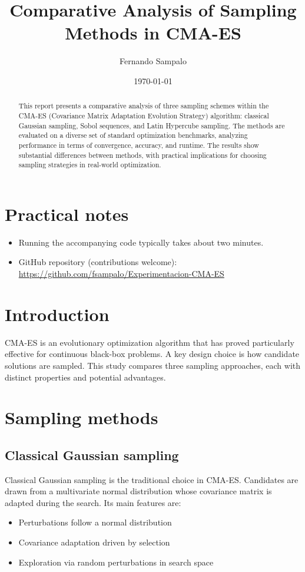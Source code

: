\documentclass[12pt,a4paper]{article}
\title{Comparative Analysis of Sampling Methods in CMA-ES}
\author{Fernando Sampalo}
\date{\today}
\begin{document}
\maketitle

\begin{abstract}
This report presents a comparative analysis of three sampling schemes within the CMA-ES (Covariance Matrix Adaptation Evolution Strategy) algorithm: classical Gaussian sampling, Sobol sequences, and Latin Hypercube sampling. The methods are evaluated on a diverse set of standard optimization benchmarks, analyzing performance in terms of convergence, accuracy, and runtime. The results show substantial differences between methods, with practical implications for choosing sampling strategies in real-world optimization.
\end{abstract}

\section{Practical notes}
\begin{itemize}
    \item Running the accompanying code typically takes about two minutes.
    \item GitHub repository (contributions welcome): \url{https://github.com/fsampalo/Experimentacion-CMA-ES}
\end{itemize}


\section{Introduction}
CMA-ES is an evolutionary optimization algorithm that has proved particularly effective for continuous black-box problems. A key design choice is how candidate solutions are sampled. This study compares three sampling approaches, each with distinct properties and potential advantages.

\section{Sampling methods}

\subsection{Classical Gaussian sampling}
Classical Gaussian sampling is the traditional choice in CMA-ES. Candidates are drawn from a multivariate normal distribution whose covariance matrix is adapted during the search. Its main features are:
\begin{itemize}
    \item Perturbations follow a normal distribution
    \item Covariance adaptation driven by selection
    \item Exploration via random perturbations in search space
\end{itemize}
\end{document}
